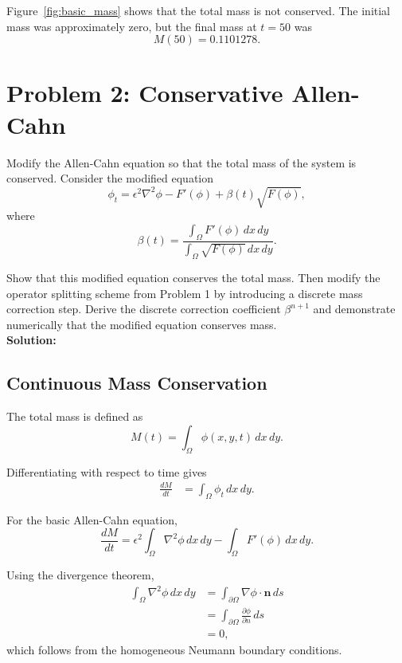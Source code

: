 \documentclass[11pt]{article}
\begin{document}
Figure~\ref{fig:basic_mass} shows that the total mass is not conserved. The initial mass was approximately zero, but the final mass at $t=50$ was
\[
    M(50)=0.1101278.
\]

\newpage

\section*{Problem 2: Conservative Allen-Cahn}

Modify the Allen-Cahn equation so that the total mass of the system is conserved. Consider the modified equation
\[
    \phi_t=
    \epsilon^2\nabla^2\phi-F'(\phi)
    +\beta(t)\sqrt{F(\phi)},
\]
where
\[
    \beta(t)=
    \frac{
        \displaystyle\int_\Omega F'(\phi)\,dx\,dy
    }{
        \displaystyle\int_\Omega\sqrt{F(\phi)}\,dx\,dy
    }.
\]

Show that this modified equation conserves the total  mass. Then modify the operator splitting scheme from Problem 1 by introducing a discrete mass correction step. Derive the discrete correction coefficient $\beta^{n+1}$ and demonstrate numerically that the modified equation conserves mass. \\

\textbf{Solution: } 

\subsection*{Continuous Mass Conservation}

The total mass is defined as
\[
    M(t)=\int_\Omega\phi(x,y,t)\,dx\,dy.
\]

Differentiating with respect to time gives
\begin{align*}
    \frac{dM}{dt}
    &=\int_\Omega\phi_t\,dx\,dy.
\end{align*}

For the basic Allen-Cahn equation,
\[
    \frac{dM}{dt}
    =
    \epsilon^2\int_\Omega\nabla^2\phi\,dx\,dy
    -\int_\Omega F'(\phi)\,dx\,dy.
\]

Using the divergence theorem,
\begin{align*}
    \int_\Omega\nabla^2\phi\,dx\,dy
    &=
    \int_{\partial\Omega}\nabla\phi\cdot\mathbf{n}\,ds\\
    &=
    \int_{\partial\Omega}
    \frac{\partial\phi}{\partial n}\,ds\\
    &=0,
\end{align*}
which follows from the homogeneous Neumann boundary conditions. \\
\end{document}
